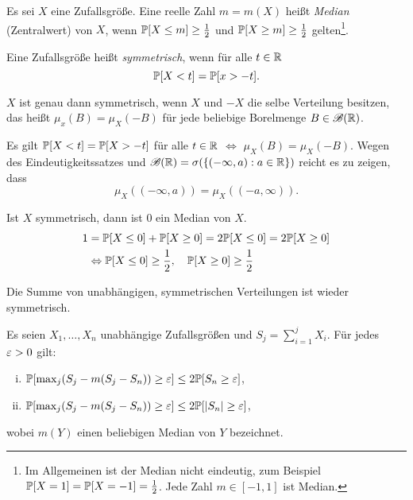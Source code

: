 \begin{defn}
  Es sei $X$ eine Zufallsgröße. Eine reelle Zahl $m = m(X)$ heißt \emph{Median}
  (Zentralwert) von $X$, wenn $\mathbb{P}[X \le m] \ge \frac{1}{2}$ und $\mathbb{P}[X \ge m] \ge
  \frac{1}{2}$ gelten\footnote{%
    Im Allgemeinen ist der Median nicht eindeutig, zum Beispiel $\mathbb{P}[X=1] =
    \mathbb{P}[X=-1] = \frac{1}{2}$. Jede Zahl $m \in [-1,1]$ ist Median.}.

  Eine Zufallsgröße heißt \emph{symmetrisch}, wenn für alle $t \in \mathbb{R}$
  \[ \mathbb{P}[X < t] = \mathbb{P}[x > -t]. \]
\end{defn}

\begin{rmrk*}
  $X$ ist genau dann symmetrisch, wenn $X$ und $-X$ die selbe Verteilung
  besitzen, das heißt $\mu_x(B) = \mu_X(-B)$ für jede beliebige Borelmenge $B
  \in \mathscr{B}(\mathbb{R})$.

  Es gilt $\mathbb{P}[X < t] = \mathbb{P}[X > -t]$ für alle $t \in \mathbb{R}$ $\Leftrightarrow$
  $\mu_X(B) = \mu_X(-B)$.  Wegen des Eindeutigkeitssatzes und $\mathscr{B}(\mathbb{R}) =
  \sigma( \{(-\infty,a) : a  \in \mathbb{R}\})$ reicht es zu zeigen, dass
  \[ \mu_X((-\infty,a)) = \mu_X((-a,\infty)). \]

  Ist $X$ symmetrisch, dann ist 0 ein Median von $X$.
  \begin{align*}
    1 &= \mathbb{P}[X \le 0] + \mathbb{P}[X \ge 0] = 2 \mathbb{P}[X \le 0] = 2 \mathbb{P}[X \ge 0] \\
      &\Leftrightarrow \mathbb{P}[X \le 0] \ge \frac{1}{2}, \quad \mathbb{P}[X \ge 0] \ge \frac{1}{2}
  \end{align*}

  Die Summe von unabhängigen, symmetrischen Verteilungen ist wieder symmetrisch.
\end{rmrk*}

\begin{thm}
  Es seien $X_1, \ldots, X_n$ unabhängige Zufallsgrößen und $S_j = \sum_{i=1}^j
  X_i$. Für jedes $\varepsilon > 0$ gilt:
  \begin{enumerate}[(i)]
  \item $\mathbb{P}[\max_j (S_j - m(S_j - S_n)) \ge \varepsilon] \le 2 \mathbb{P}[ S_n \ge \varepsilon]$,
  \item $\mathbb{P}[\max_j (S_j - m(S_j - S_n)) \ge \varepsilon] \le 2 \mathbb{P}[ |S_n| \ge \varepsilon]$,
  \end{enumerate}
  wobei $m(Y)$ einen beliebigen Median von $Y$ bezeichnet.
\end{thm}

